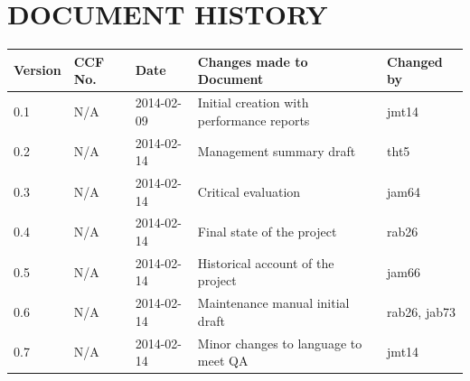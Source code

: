 \documentclass{project}
\begin{document}
\section*{DOCUMENT HISTORY}
\begin{tabular}{|l | l | l | l | l |}
\hline
Version & CCF No. & Date & Changes made to Document & Changed by \\
\hline
0.1 & N/A & 2014-02-09 & Initial creation with performance reports & jmt14 \\
\hline
0.2 & N/A & 2014-02-14 & Management summary draft & tht5 \\
\hline
0.3 & N/A & 2014-02-14 & Critical evaluation & jam64 \\
\hline
0.4 & N/A & 2014-02-14 & Final state of the project & rab26 \\
\hline
0.5 & N/A & 2014-02-14 & Historical account of the project & jam66 \\
\hline
0.6 & N/A & 2014-02-14 & Maintenance manual initial draft & rab26, jab73 \\
\hline
0.7 & N/A & 2014-02-14 & Minor changes to language to meet QA & jmt14 \\

\hline
\end{tabular}
\label{thelastpage}
\end{document}
